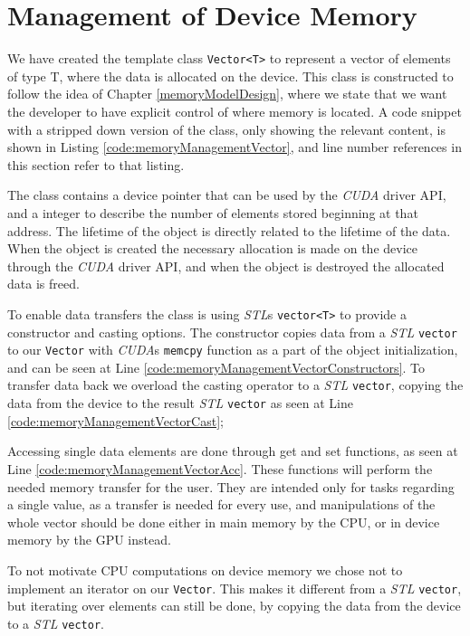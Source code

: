 \section{Management of Device Memory}
We have created the template class \texttt{Vector<T>} to represent a vector of elements of type T, where the data is allocated on the device. This class is constructed to follow the idea of Chapter \ref{memoryModelDesign}, where we state that we want the developer to have explicit control of where memory is located. A code snippet with a stripped down version of the class, only showing the relevant content, is shown in Listing \ref{code:memoryManagementVector}, and line number references in this section refer to that listing.

The class contains a device pointer that can be used by the \textit{CUDA} driver API, and a integer to describe the number of elements stored beginning at that address. The lifetime of the object is directly related to the lifetime of the data. When the object is created the necessary allocation is made on the device through the \textit{CUDA} driver API, and when the object is destroyed the allocated data is freed.

To enable data transfers the class is using \textit{STL}s \texttt{vector<T>} to provide a constructor and casting options. The constructor copies data from a \textit{STL} \texttt{vector} to our \texttt{Vector} with \textit{CUDA}s \texttt{memcpy} function as a part of the object initialization, and can be seen at Line \ref{code:memoryManagementVectorConstructors}. To transfer data back we overload the casting operator to a \textit{STL} \texttt{vector}, copying the data from the device to the result \textit{STL} \texttt{vector} as seen at Line \ref{code:memoryManagementVectorCast};

Accessing single data elements are done through get and set functions, as seen at Line \ref{code:memoryManagementVectorAcc}. These functions will perform the needed memory transfer for the user. They are intended only for tasks regarding a single value, as a transfer is needed for every use, and manipulations of the whole vector should be done either in main memory by the CPU, or in device memory by the GPU instead.

To not motivate CPU computations on device memory we chose not to implement an iterator on our \texttt{Vector}. This makes it different from a \textit{STL} \texttt{vector}, but iterating over elements can still be done, by copying the data from the device to a \textit{STL} \texttt{vector}.

